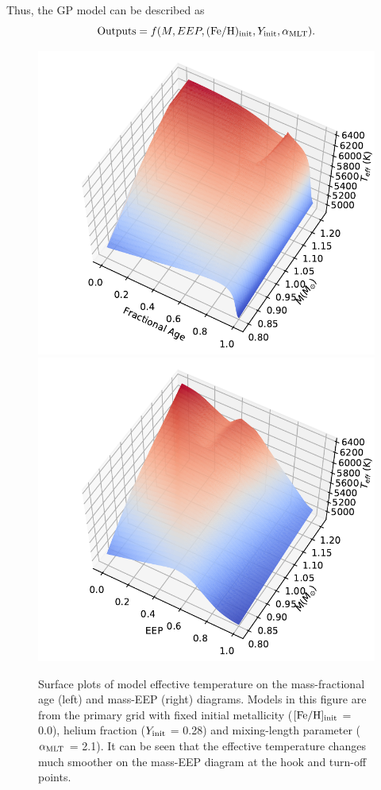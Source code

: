 Thus, the GP model can be described as 
\begin{equation}\label{gprmodel}
{\rm Outputs} = f(M, EEP, ({\rm Fe/H})_{\rm init}, Y_{\rm init}, \alpha_{\rm MLT}). 
\end{equation}

\begin{figure}
        \includegraphics[width=1.\columnwidth]{2d_fage_data.pdf}
	\includegraphics[width=1.\columnwidth]{2d_EEP_data.pdf}
     \caption{Surface plots of model effective temperature on the mass-fractional age (left) and mass-EEP (right) diagrams. Models in this figure are from the primary grid with fixed initial metallicity ($\rm [Fe/H]_{init}$ = 0.0), helium fraction ($Y_{\rm init}$ = 0.28) and mixing-length parameter ($\alpha_{\rm MLT}$ = 2.1). It can be seen that the effective temperature changes much smoother on the mass-EEP diagram at the hook and turn-off points.}
    \label{fig:eep}
\end{figure}

